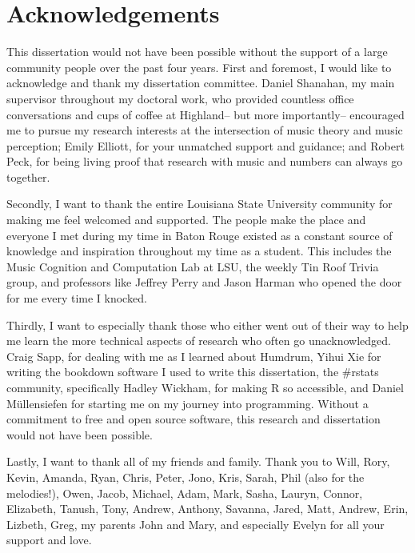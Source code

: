 \documentclass[12pt,]{book}
\begin{document}
\let\cleardoublepage\clearpage

\let\bforigdefault\bfdefault
{}

\pagestyle{plain}
\chapter{Acknowledgements}

This dissertation would not have been possible without the support of a large community people over the past four years.
First and foremost, I would like to acknowledge and thank my dissertation committee.
Daniel Shanahan, my main supervisor throughout my doctoral work, who provided countless office conversations and cups of coffee at Highland-- but more importantly-- encouraged me to pursue my research interests at the intersection of music theory and music perception; Emily Elliott, for your unmatched support and guidance; and Robert Peck, for being living proof that research with music and numbers can always go together.

Secondly, I want to thank the entire Louisiana State University community for making me feel welcomed and supported.
The people make the place and everyone I met during my time in Baton Rouge existed as a constant source of knowledge and inspiration throughout my time as a student.
This includes the Music Cognition and Computation Lab at LSU, the weekly Tin Roof Trivia group, and professors like Jeffrey Perry and Jason Harman who opened the door for me every time I knocked.

Thirdly, I want to especially thank those who either went out of their way to help me learn the more technical aspects of research who often go unacknowledged.
Craig Sapp, for dealing with me as I learned about Humdrum, Yihui Xie for writing the bookdown software I used to write this dissertation, the \#rstats community, specifically Hadley Wickham, for making R so accessible, and Daniel Müllensiefen for starting me on my journey into programming.
Without a commitment to free and open source software, this research and dissertation would not have been possible.

Lastly, I want to thank all of my friends and family.
Thank you to Will, Rory, Kevin, Amanda, Ryan, Chris, Peter, Jono, Kris, Sarah, Phil (also for the melodies!), Owen, Jacob, Michael, Adam, Mark, Sasha, Lauryn, Connor, Elizabeth, Tanush, Tony, Andrew, Anthony, Savanna, Jared, Matt, Andrew, Erin, Lizbeth, Greg, my parents John and Mary, and especially Evelyn for all your support and love.
\let\cleardoublepage\clearpage
\newpage
\end{document}
